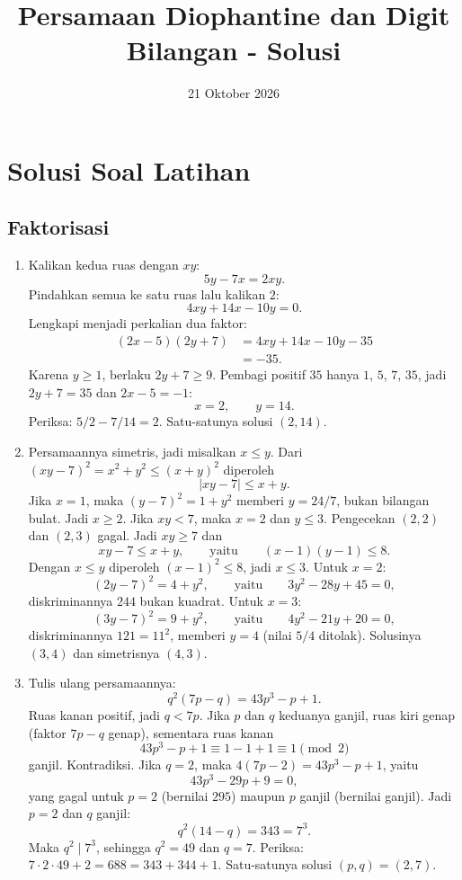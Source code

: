 \documentclass[12pt]{scrartcl}
\title{Persamaan Diophantine dan Digit Bilangan - Solusi}
\date{21 Oktober 2026}
\begin{document}
\maketitle

\renewcommand*\contentsname{Daftar Isi}
\tableofcontents

\newpage

\section{Solusi Soal Latihan}

\subsection{Faktorisasi}

\begin{enumerate}
	\item Kalikan kedua ruas dengan $xy$:
	\[ 5y - 7x = 2xy. \]
	Pindahkan semua ke satu ruas lalu kalikan $2$:
	\[ 4xy + 14x - 10y = 0. \]
	Lengkapi menjadi perkalian dua faktor:
	\begin{align*}
	(2x - 5)(2y + 7) &= 4xy + 14x - 10y - 35 \\
	&= -35.
	\end{align*}
	Karena $y \ge 1$, berlaku $2y + 7 \ge 9$.
	Pembagi positif $35$ hanya $1$, $5$, $7$, $35$,
	jadi $2y + 7 = 35$ dan $2x - 5 = -1$:
	\[ x = 2, \qquad y = 14. \]
	Periksa: $5/2 - 7/14 = 2$. Satu-satunya solusi $(2, 14)$.

	\item Persamaannya simetris, jadi misalkan $x \le y$.
	Dari $(xy - 7)^2 = x^2 + y^2 \le (x + y)^2$ diperoleh
	\[ |xy - 7| \le x + y. \]
	Jika $x = 1$, maka $(y - 7)^2 = 1 + y^2$ memberi $y = 24/7$,
	bukan bilangan bulat. Jadi $x \ge 2$.
	Jika $xy < 7$, maka $x = 2$ dan $y \le 3$.
	Pengecekan $(2, 2)$ dan $(2, 3)$ gagal.
	Jadi $xy \ge 7$ dan
	\[ xy - 7 \le x + y, \qquad \text{yaitu} \qquad (x - 1)(y - 1) \le 8. \]
	Dengan $x \le y$ diperoleh $(x - 1)^2 \le 8$, jadi $x \le 3$.
	Untuk $x = 2$:
	\[ (2y - 7)^2 = 4 + y^2, \qquad \text{yaitu} \qquad 3y^2 - 28y + 45 = 0, \]
	diskriminannya $244$ bukan kuadrat.
	Untuk $x = 3$:
	\[ (3y - 7)^2 = 9 + y^2, \qquad \text{yaitu} \qquad 4y^2 - 21y + 20 = 0, \]
	diskriminannya $121 = 11^2$, memberi $y = 4$ (nilai $5/4$ ditolak).
	Solusinya $(3, 4)$ dan simetrisnya $(4, 3)$.

	\item Tulis ulang persamaannya:
	\[ q^2(7p - q) = 43p^3 - p + 1. \]
	Ruas kanan positif, jadi $q < 7p$.
	Jika $p$ dan $q$ keduanya ganjil, ruas kiri genap (faktor $7p - q$ genap),
	sementara ruas kanan
	\[ 43p^3 - p + 1 \equiv 1 - 1 + 1 \equiv 1 \pmod{2} \]
	ganjil. Kontradiksi.
	Jika $q = 2$, maka $4(7p - 2) = 43p^3 - p + 1$, yaitu
	\[ 43p^3 - 29p + 9 = 0, \]
	yang gagal untuk $p = 2$ (bernilai $295$) maupun $p$ ganjil (bernilai ganjil).
	Jadi $p = 2$ dan $q$ ganjil:
	\[ q^2(14 - q) = 343 = 7^3. \]
	Maka $q^2 \mid 7^3$, sehingga $q^2 = 49$ dan $q = 7$.
	Periksa: $7 \cdot 2 \cdot 49 + 2 = 688 = 343 + 344 + 1$.
	Satu-satunya solusi $(p, q) = (2, 7)$.


\end{enumerate}
\end{document}

